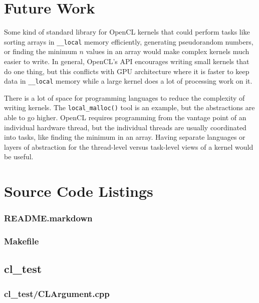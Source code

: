 \documentclass{article}
\begin{document}
\section{Future Work}
Some kind of standard library for OpenCL kernels that could perform tasks like sorting arrays in \texttt{\_\_local} memory efficiently, generating pseudorandom numbers, or finding the minimum $n$ values in an array would make complex kernels much easier to write. In general, OpenCL's API encourages writing small kernels that do one thing, but this conflicts with GPU architecture where it is faster to keep data in \texttt{\_\_local} memory while a large kernel does a lot of processing work on it.

There is a lot of space for programming languages to reduce the complexity of writing kernels. The \texttt{local\_malloc()} tool is an example, but the abstractions are able to go higher. OpenCL requires programming from the vantage point of an individual hardware thread, but the individual threads are usually coordinated into tasks, like finding the minimum in an array. Having separate languages or layers of abstraction for the thread-level versus task-level views of a kernel would be useful.




\appendix
\section{Source Code Listings}

\subsubsection*{README.markdown}


\subsubsection*{Makefile}


\subsection*{cl\_test}
\subsubsection*{cl\_test/CLArgument.cpp}

\end{document}
